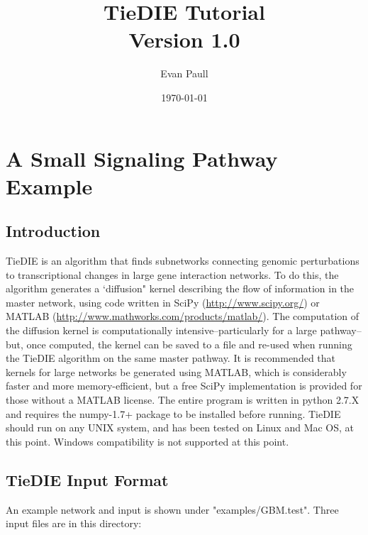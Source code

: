 \documentclass[11pt]{report}
\author{Evan Paull \emailaddr{epaull@soe.ucsc.edu}}
\title{TieDIE Tutorial \\ Version 1.0}
\date{\today}
\begin{document}
\maketitle

\tableofcontents

\singlespace

\chapter{A Small Signaling Pathway Example}

\section{Introduction}

\noindent TieDIE is an algorithm that finds subnetworks connecting genomic perturbations to transcriptional changes in 
large gene interaction networks. To do this, the algorithm generates a `diffusion" kernel describing
the flow of information in the master network, using code written in SciPy (\url{http://www.scipy.org/}) or 
 MATLAB (\url{http://www.mathworks.com/products/matlab/}). The computation of the diffusion kernel is computationally
intensive--particularly for a large pathway--but, once computed, the kernel can be saved to a file and re-used
when running the TieDIE algorithm on the same master pathway. It is recommended that kernels for large networks
be generated using MATLAB, which is considerably faster and more memory-efficient, but a free SciPy implementation is 
provided for those without a MATLAB license. The entire program is written in python 2.7.X and requires the numpy-1.7+
package to be installed before running. TieDIE should run on any UNIX system, and has been tested on Linux and Mac OS, at this 
point. Windows compatibility is not supported at this point. 

\section{TieDIE Input Format}

\noindent An example network and input is shown under "examples/GBM.test". Three input files are in this directory: 
\end{document}
